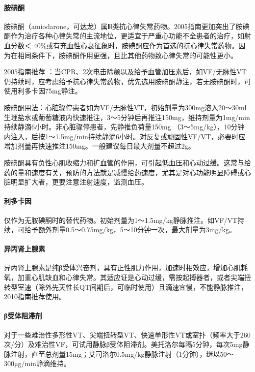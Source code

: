 \paragraph{胺碘酮}

胺碘酮（amiodarone，可达龙）属Ⅲ类抗心律失常药物。2005指南更加突出了胺碘酮作为治疗各种心律失常的主流地位，更适宜于严重心功能不全患者的治疗，如射血分数＜
40\%或有充血性心衰征象时，胺碘酮应作为首选的抗心律失常药物。因为在相同条件下，胺碘酮作用更强，且比其他药物致心律失常的可能性更小。

2005指南推荐
：当CPR、2次电击除颤以及给予血管加压素后，如VF/无脉性VT仍持续时，应考虑给予抗心律失常药物，优先选用胺碘酮静注，若无胺碘酮时，可使用利多卡因75mg静注。

胺碘酮用法：心脏骤停患者如为VF/无脉性VT，初始剂量为300mg溶入20～30ml生理盐水或葡萄糖液内快速推注，3～5分钟后再推注150mg，维持剂量为1mg/min持续静滴6小时。非心脏骤停患者，先静推负荷量150mg
（3～5mg/kg），10分钟内注入，后按1～1.5mg/min持续静滴6小时。对反复或顽固性VF/VT，必要时应增加剂量再快速推注150mg。一般建议每日最大剂量不超过2g。

胺碘酮具有负性心肌收缩力和扩血管的作用，可引起低血压和心动过缓。这常与给药的量和速度有关，预防的方法就是减慢给药速度，尤其是对心功能明显障碍或心脏明显扩大者，更要注意注射速度，监测血压。

\paragraph{利多卡因}

仅作为无胺碘酮时的替代药物。初始剂量为1～1.5mg/kg静脉推注。如VF/VT持续，可给予额外剂量0.5～0.75mg/kg，5～10分钟一次，最大剂量为3mg/kg。

\paragraph{异丙肾上腺素}

异丙肾上腺素是纯β受体兴奋剂，具有正性肌力作用，加速时相效应，增加心肌耗氧，加重心肌缺血和心律失常。其适应证是心动过缓，需按起搏器者，或者尖端扭转型室速（除外先天性长QT间期后，可临时使用）且滴速宜慢，不能静脉推注，2010指南推荐使用。

\paragraph{β受体阻滞剂}

对于一些难治性多形性VT、尖端扭转型VT、快速单形性VT或室扑（频率大于260次/分）及难治性VF，可试用静脉β受体阻滞剂。美托洛尔每隔5分钟，每次5mg静脉注射，直至总剂量15mg；艾司洛尔0.5mg/kg静脉注射（1分钟），继以50～300μg/min静滴维持。

